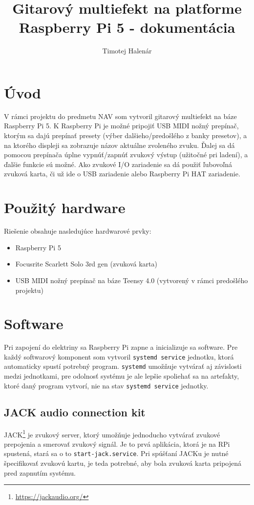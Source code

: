\documentclass{article}
\title{Gitarový multiefekt na platforme Raspberry Pi 5 - dokumentácia}
\author{Timotej Halenár}
\begin{document}
\maketitle

\section{Úvod}
V rámci projektu do predmetu NAV som vytvoril gitarový multiefekt na báze Raspberry Pi 5. K Raspberry Pi je možné pripojiť USB MIDI nožný prepínač, ktorým sa dajú prepínať presety (výber dalšieho/predošlého z banky presetov), a na ktorého displeji sa zobrazuje názov aktuálne zvoleného zvuku. Ďalej sa dá pomocou prepínača úplne vypnúť/zapnúť zvukový výstup (užitočné pri ladení), a ďalšie funkcie sú možné. Ako zvukové I/O zariadenie sa dá použiť ľubovoľná zvuková karta, či už ide o USB zariadenie alebo Raspberry Pi HAT zariadenie.

\section{Použitý hardware}

Riešenie obsahuje nasledujúce hardwarové prvky:
\begin{itemize}
    \item Raspberry Pi 5
    \item Focusrite Scarlett Solo 3rd gen (zvuková karta)
    \item USB MIDI nožný prepínač na báze Teensy 4.0 (vytvorený v rámci predošlého projektu)
\end{itemize}

\section{Software}
Pri zapojení do elektriny sa Raspberry Pi zapne a inicializuje sa software. Pre každý softwarový komponent som vytvoril \texttt{systemd service} jednotku, ktorá automaticky spustí potrebný program. \texttt{systemd} umožňuje vytvárať aj závislosti medzi jednotkami, pre odolnosť systému je ale lepšie spoliehať sa na artefakty, ktoré daný program vytvorí, nie na stav \texttt{systemd service} jednotky.

\subsection{JACK audio connection kit}
JACK\footnote{\url{https://jackaudio.org/}} je zvukový server, ktorý umožňuje jednoducho vytvárať zvukové prepojenia a smerovať zvukový signál. Je to prvá aplikácia, ktorá je na RPi spustená, stará sa o to \texttt{start-jack.service}. Pri spúšťaní JACKu je nutné špecifikovať zvukovú kartu, je teda potrebné, aby bola zvuková karta pripojená pred zapnutím systému.
\end{document}

